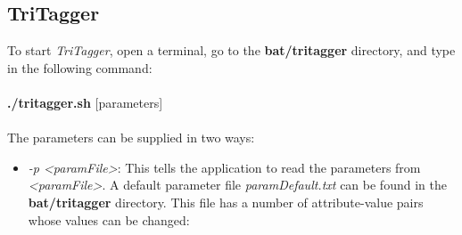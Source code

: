 \documentclass[11pt]{article}
\begin{document}
\subsection{TriTagger}
\label{sec:tritagger_usage}
To start \emph{TriTagger}, open a terminal, go to the \textbf{bat/tritagger} directory, and type in the following command:\\ \\
{\bf ./tritagger.sh} [parameters] \\ \\
The parameters can be supplied in two ways:
\begin{itemize}
\item \emph{-p <paramFile>}: This tells the application to read the parameters from \emph{<paramFile>}. A default parameter file \emph{paramDefault.txt} can be found in the \textbf{bat/tritagger} directory.
This file has a number of attribute-value pairs whose values can be changed:


\end{itemize}
\end{document}
